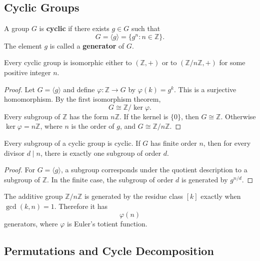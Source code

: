 \subsection{Cyclic Groups}

\begin{definition}
A group $G$ is \textbf{cyclic} if there exists $g\in G$ such that
\[
    G=\langle g\rangle=\{g^n:n\in\mathbb{Z}\}.
\]
The element $g$ is called a \textbf{generator} of $G$.
\end{definition}

\begin{theorem}
Every cyclic group is isomorphic either to $(\mathbb{Z},+)$ or to $(\mathbb{Z}/n\mathbb{Z},+)$ for some positive integer $n$.
\end{theorem}

\begin{proof}
Let $G=\langle g\rangle$ and define $\varphi:\mathbb{Z}\to G$ by $\varphi(k)=g^k$. This is a surjective homomorphism. By the first isomorphism theorem,
\[
    G\cong\mathbb{Z}/\ker\varphi.
\]
Every subgroup of $\mathbb{Z}$ has the form $n\mathbb{Z}$. If the kernel is $\{0\}$, then $G\cong\mathbb{Z}$. Otherwise $\ker\varphi=n\mathbb{Z}$, where $n$ is the order of $g$, and $G\cong\mathbb{Z}/n\mathbb{Z}$.
\end{proof}

\begin{corollary}
Every subgroup of a cyclic group is cyclic. If $G$ has finite order $n$, then for every divisor $d\mid n$, there is exactly one subgroup of order $d$.
\end{corollary}

\begin{proof}
For $G=\langle g\rangle$, a subgroup corresponds under the quotient description to a subgroup of $\mathbb{Z}$. In the finite case, the subgroup of order $d$ is generated by $g^{n/d}$.
\end{proof}

\begin{example}
The additive group $\mathbb{Z}/n\mathbb{Z}$ is generated by the residue class $[k]$ exactly when $\gcd(k,n)=1$. Therefore it has
\[
    \varphi(n)
\]
generators, where $\varphi$ is Euler's totient function.
\end{example}

\subsection{Permutations and Cycle Decomposition}

